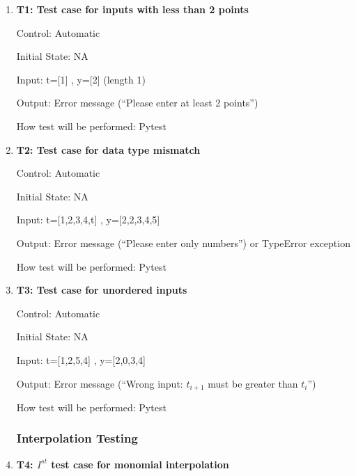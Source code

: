 \documentclass[12pt, titlepage]{article}
\begin{document}
\begin{enumerate}

\item{\textbf{T1: Test case for inputs with less than 2 points}\\}\label{{T1}}

Control: Automatic

Initial State: NA

Input: t=[1] , y=[2] (length 1)

Output: Error message (``Please enter at least  2 
points'')

How test will be performed: Pytest

\item{\textbf{T2: Test case for data type mismatch}\\}

Control: Automatic

Initial State: NA

Input: t=[1,2,3,4,t] , y=[2,2,3,4,5] 

Output: Error message (``Please enter only numbers'') or TypeError exception

How test will be performed: Pytest

\item{\textbf{T3: Test case for unordered inputs}\\}

Control: Automatic

Initial State: NA

Input: t=[1,2,5,4] , y=[2,0,3,4] 

Output: Error message (``Wrong input: $t_{i+1}$ must be greater than $t_i$'')

How test will be performed: Pytest



\subsubsection{Interpolation Testing}\label{InterpolationTesting}



\item{\textbf{T4: $I^{st}$ test case for monomial interpolation} \\}


\end{enumerate}
\end{document}
